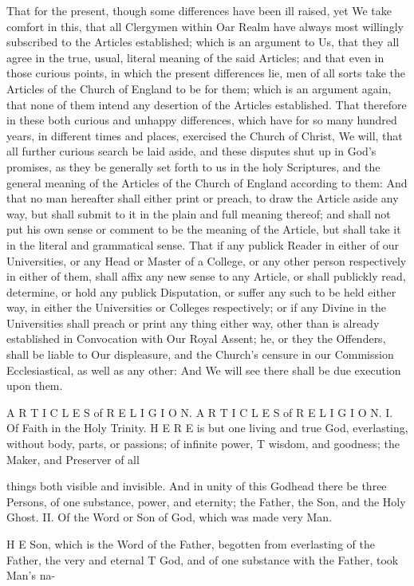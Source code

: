 That for the present, though some differences have been ill raised, yet We take comfort in this, that all Clergymen within Oar Realm have always most willingly subscribed to the Articles established; which is an argument to Us, that they all agree in the true, usual, literal meaning of the said Articles; and that even in those curious points, in which the present differences lie, men of all sorts take the Articles of the Church of England to be for them; which is an argument again, that none of them intend any desertion of the Articles established. That therefore in these both curious and unhappy differences, which have for so many hundred years, in different times and places, exercised the Church of Christ, We will, that all further curious search be laid aside, and these disputes shut up in God’s promises, as they be generally set forth to us in the holy Scriptures, and the general meaning of the Articles of the Church of England according to them: And that no man hereafter shall either print or preach, to draw the Article aside any way, but shall submit to it in the plain and full meaning thereof; and shall not put his own sense or comment to be the meaning of the Article, but shall take it in the literal and grammatical sense. That if any publick Reader in either of our Universities, or any Head or Master of a College, or any other person respectively in either of them, shall affix any new sense to any Article, or shall publickly read, determine, or hold any publick Disputation, or suffer any such to be held either way, in either the Universities or Colleges respectively; or if any Divine in the Universities shall preach or print any thing either way, other than is already established in Convocation with Our Royal Assent; he, or they the Offenders, shall be liable to Our displeasure, and the Church's censure in our Commission Ecclesiastical, as well as any other: And We will see there shall be due execution upon them.

A R T I C L E S of R E L I G I O N. A R T I C L E S of R E L I G I O N. I. Of Faith in the Holy Trinity. H E R E is but one living and true God, everlasting, without body, parts, or passions; of infinite power, T wisdom, and goodness; the Maker, and Preserver of all

things both visible and invisible. And in unity of this Godhead there be three Persons, of one substance, power, and eternity; the Father, the Son, and the Holy Ghost. II. Of the Word or Son of God, which was made very Man.

H E Son, which is the Word of the Father, begotten from everlasting of the Father, the very and eternal T God, and of one substance with the Father, took Man’s na-

